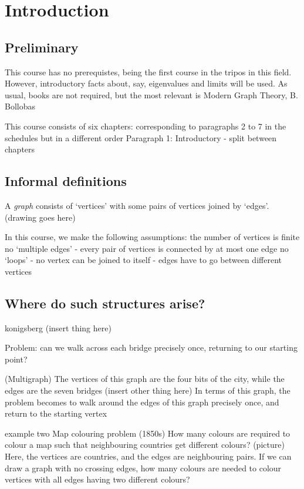 \documentclass{article}
\begin{document}
\maketitle

\section{Introduction}

\subsection{Preliminary}
This course has no prerequistes, being the first course in the tripos in this field.  However, introductory facts about, say, eigenvalues and limits will be used.
As usual, books are not required, but the most relevant is Modern Graph Theory, B. Bollobas


This course consists of six chapters: corresponding to paragraphs 2 to 7 in the schedules but in a different order
Paragraph 1: Introductory - split between chapters

\subsection{Informal definitions}
A \emph{graph} consists of `vertices' with some pairs of vertices joined by `edges'.
(drawing goes here)

In this course, we make the following assumptions:
the number of vertices is finite
no `multiple edges' - every pair of vertices is connected by at most one edge
no `loops' - no vertex can be joined to itself - edges have to go between different vertices

\subsection{Where do such structures arise?}
konigsberg (insert thing here)

Problem: can we walk across each bridge precisely once, returning to our starting point?

(Multigraph) The vertices of this graph are the four bits of the city, while the edges are the seven bridges
(insert other thing here)
In terms of this graph, the problem becomes to walk around the edges of this graph precisely once, and return to the starting vertex

example two
Map colouring problem (1850s)
How many colours are required to colour a map such that neighbouring countries get different colours?
(picture)
Here, the vertices are countries, and the edges are neighbouring pairs.
If we can draw a graph with no crossing edges, how many colours are needed to colour vertices with all edges having two different colours?
\end{document}
